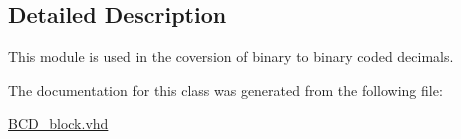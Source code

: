 \subsection{Detailed Description}
This module is used in the coversion of binary to binary coded decimals. 

The documentation for this class was generated from the following file\-:\begin{DoxyCompactItemize}
\item 
\hyperlink{BCD__block_8vhd}{B\-C\-D\-\_\-block.\-vhd}\end{DoxyCompactItemize}
